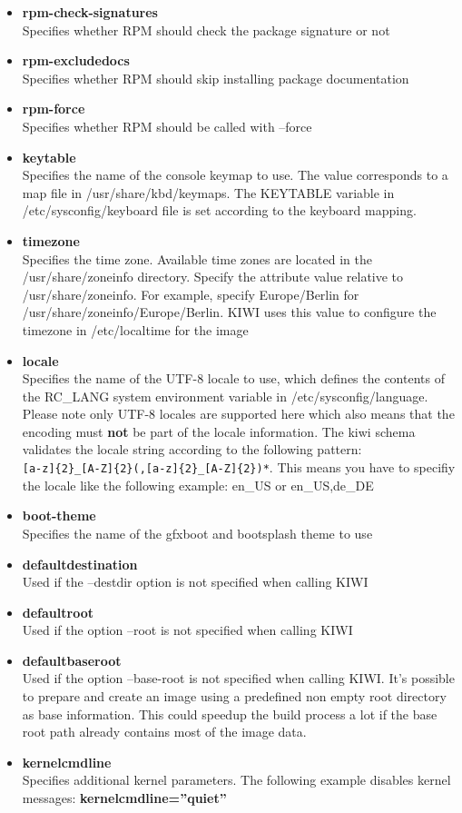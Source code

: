 \begin{itemize}
\item \textbf{rpm-check-signatures}\\
      Specifies whether RPM should check the package signature or not
\item \textbf{rpm-excludedocs}\\
      Specifies whether RPM should skip installing package documentation
\item \textbf{rpm-force}\\
      Specifies whether RPM should be called with --force
\item \textbf{keytable}\\
      Specifies the name of the console keymap to use. The value corresponds
      to a map file in /usr/share/kbd/keymaps. The KEYTABLE variable in
      /etc/sysconfig/keyboard file is set according to the keyboard
      mapping.
\item \textbf{timezone}\\
      Specifies the time zone. Available time zones are located in the
      /usr/share/zoneinfo directory. Specify the attribute value relative to
      /usr/share/zoneinfo. For example, specify Europe/Berlin for
      /usr/share/zoneinfo/Europe/Berlin. KIWI uses this value to configure
      the timezone in /etc/localtime for the image
\item \textbf{locale}\\
      Specifies the name of the UTF-8 locale to use, which defines the
      contents of the RC\_LANG system environment variable in
      /etc/sysconfig/language. Please note only UTF-8 locales are supported
      here which also means that the encoding must \textbf{not} be part of
      the locale information. The kiwi schema validates the locale string
      according to the following pattern:\\
      \verb+[a-z]{2}_[A-Z]{2}(,[a-z]{2}_[A-Z]{2})*+.
      This means you have to specifiy the locale like the following example:
      en\_US or en\_US,de\_DE
\item \textbf{boot-theme}\\
      Specifies the name of the gfxboot and bootsplash theme to use
\item \textbf{defaultdestination}\\
      Used if the --destdir option is not specified when calling KIWI
\item \textbf{defaultroot}\\
      Used if the option --root is not specified when calling KIWI
\item \textbf{defaultbaseroot}\\
      Used if the option --base-root is not specified when
      calling KIWI. It's possible to prepare and create an image using a
      predefined non empty root directory as base information.
      This could speedup the build process a lot if the base root path
      already contains most of the image data.
\item \textbf{kernelcmdline}\\
      Specifies additional kernel parameters. The following example
      disables kernel messages: \textbf{kernelcmdline=''quiet''}
\end{itemize}


